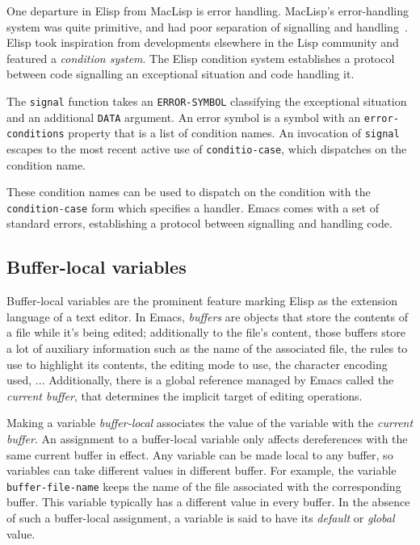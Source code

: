 \documentclass[format=acmsmall, review=false, screen=true]{acmart}
\newcommand \Elisp {Elisp}
\begin{document}
One departure in \Elisp{} from MacLisp is error handling.  MacLisp's
error-handling system was quite primitive, and had poor separation of
signalling and handling~\cite{Pitman2001}.  \Elisp{} took inspiration
from developments elsewhere in the Lisp community and featured a
\emph{condition system}.  The \Elisp{} condition system establishes
a protocol between code signalling an exceptional situation and code
handling it.

The \texttt{signal} function takes an \texttt{ERROR-SYMBOL}
classifying the exceptional situation and an additional \texttt{DATA}
argument.  An error symbol is a symbol with an
\texttt{error-conditions} property that is a list of condition names.
An invocation of \texttt{signal} escapes to the most recent active use
of \texttt{conditio-case}, which dispatches on the condition name.

These condition names can be used to dispatch on the condition with
the \texttt{condition-case} form which specifies a handler.  Emacs
comes with a set of standard errors, establishing a protocol between
signalling and handling code.

\subsection{Buffer-local variables}
\label{sec:buffer-local-variables}

Buffer-local variables are the prominent feature marking \Elisp{} as the
extension language of a text editor.  In Emacs, \emph{buffers} are objects
that store the contents of a file while it's being edited; additionally to
the file's content, those buffers store a lot of auxiliary information such
as the name of the associated file, the rules to use to highlight its
contents, the editing mode to use, the character encoding used, ...
Additionally, there is a global reference managed by Emacs called the
\emph{current buffer}, that determines the implicit target of
editing operations.

Making a variable \emph{buffer-local} associates the value of the variable
with the \emph{current buffer}.  An assignment to a buffer-local variable
only affects dereferences with the same current buffer in effect.
Any variable can be made local to any buffer, so variables can take
different values in different buffer.  For example, the variable
\texttt{buffer-file-name} keeps the name of the file associated with the
corresponding buffer.  This variable typically has a different value in
every buffer.  In the absence of such a buffer-local assignment, a variable
is said to have its \emph{default} or \emph{global} value.
\end{document}
